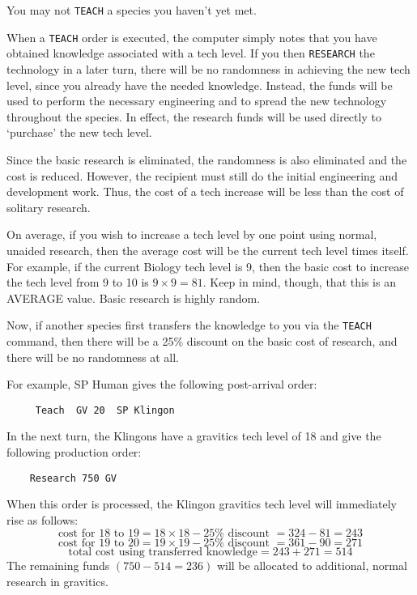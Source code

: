 \documentclass[10pt,titlepage]{article}
\begin{document}
You may not \texttt{TEACH} a species you haven't yet met.

When a \texttt{TEACH} order is executed, the computer simply notes that you have
obtained knowledge associated with a tech level.  If you then \texttt{RESEARCH} the
technology in a later turn, there will be no randomness in achieving the new
tech level, since you already have the needed knowledge.  Instead, the funds
will be used to perform the necessary engineering and to spread the new
technology throughout the species.  In effect, the research funds will be
used directly to `purchase' the new tech level.

Since the basic research is eliminated, the randomness is also eliminated
and the cost is reduced.  However, the recipient must still do the initial
engineering and development work.  Thus, the cost of a tech increase will be
less than the cost of solitary research.

On average, if you wish to increase a tech level by one point using normal,
unaided research, then the average cost will be the current tech level times
itself.  For example, if the current Biology tech level is 9, then the basic
cost to increase the tech level from 9 to 10 is $9 \times 9 = 81$.  Keep in mind,
though, that this is an AVERAGE value.  Basic research is highly random.

Now, if another species first transfers the knowledge to you via the \texttt{TEACH}
command, then there will be a 25\% discount on the basic cost of research, and
there will be no randomness at all.

For example, SP Human gives the following post-arrival order:

\begin{verbatim}
     Teach  GV 20  SP Klingon\end{verbatim} 

In the next turn, the Klingons have a gravitics tech level of 18 and give the
following production order:

\begin{verbatim}
    Research 750 GV\end{verbatim} 

When this order is processed, the Klingon gravitics tech level will immediately
rise as follows:
\[
	\textrm{cost for } 18 \textrm{ to } 19 = 18 \times 18 - 25\% \textrm{ discount } = 324 - 81 = 243 
\]
\[
	\textrm{cost for } 19 \textrm{ to } 20 = 19 \times 19 - 25\% \textrm{ discount } = 361 - 90 = 271
\]
\[
	\textrm{total cost using transferred knowledge} = 243 + 271 = 514
\]
The remaining funds $(750 - 514 = 236)$ will be allocated to additional, normal
research in gravitics.
\end{document}
